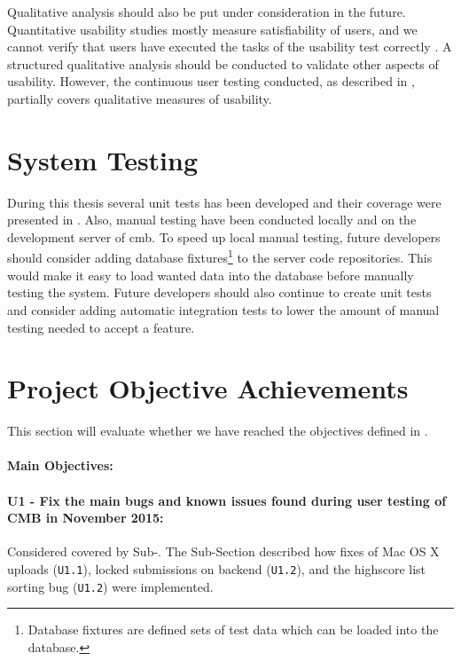 Qualitative analysis should also be put under consideration in the future. Quantitative usability studies mostly measure satisfiability of users, and we cannot verify that users have executed the tasks of the usability test correctly \cite{holzinger2005}. A structured qualitative analysis should be conducted to validate other aspects of usability. However, the continuous user testing conducted, as described in , partially covers qualitative measures of usability.

\section{System Testing}
\label{sec:eval-sys-testing}
During this thesis several unit tests has been developed and their coverage were presented in . Also, manual testing have been conducted locally and on the development server of \gls{cmb}. To speed up local manual testing, future developers should consider adding database fixtures\footnote{Database fixtures are defined sets of test data which can be loaded into the database.} to the server code repositories. This would make it easy to load wanted data into the database before manually testing the system. Future developers should also continue to create unit tests and consider adding automatic integration tests to lower the amount of manual testing needed to accept a feature.

\section{Project Objective Achievements}
\label{sec:eval-pr-achiev}
This section will evaluate whether we have reached the objectives defined in .

\paragraph*{Main Objectives:} \hfill

\paragraph*{U1 - Fix the main bugs and known issues found during user testing of CMB in November 2015:} Considered covered by Sub-. The Sub-Section described how fixes of Mac OS X uploads (\texttt{U1.1}), locked submissions on backend (\texttt{U1.2}), and the highscore list sorting bug (\texttt{U1.2}) were implemented.

